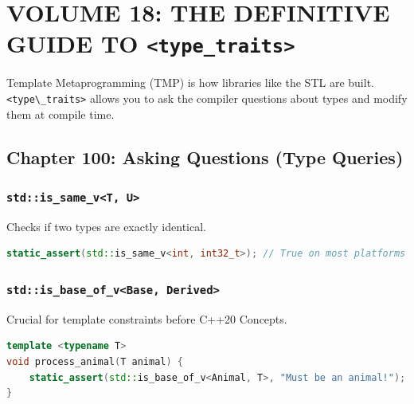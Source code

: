 \hypertarget{volume-18-the-definitive-guide-to-type_traits}{%
\section{\texorpdfstring{VOLUME 18: THE DEFINITIVE GUIDE TO
\texttt{\textless{}type\_traits\textgreater{}}}{VOLUME 18: THE DEFINITIVE GUIDE TO \textless type\_traits\textgreater{}}}\label{volume-18-the-definitive-guide-to-type_traits}}

Template Metaprogramming (TMP) is how libraries like the STL are built.
\passthrough{\lstinline!<type\_traits>!} allows you to ask the compiler
questions about types and modify them at compile time.

\hypertarget{chapter-100-asking-questions-type-queries}{%
\subsection{Chapter 100: Asking Questions (Type
Queries)}\label{chapter-100-asking-questions-type-queries}}

\hypertarget{stdis_same_vt-u}{%
\subsubsection{\texorpdfstring{\texttt{std::is\_same\_v\textless{}T,\ U\textgreater{}}}{std::is\_same\_v\textless T, U\textgreater{}}}\label{stdis_same_vt-u}}

Checks if two types are exactly identical.

\begin{lstlisting}[language={C++}]
static_assert(std::is_same_v<int, int32_t>); // True on most platforms
\end{lstlisting}

\hypertarget{stdis_base_of_vbase-derived}{%
\subsubsection{\texorpdfstring{\texttt{std::is\_base\_of\_v\textless{}Base,\ Derived\textgreater{}}}{std::is\_base\_of\_v\textless Base, Derived\textgreater{}}}\label{stdis_base_of_vbase-derived}}

Crucial for template constraints before C++20 Concepts.

\begin{lstlisting}[language={C++}]
template <typename T>
void process_animal(T animal) {
    static_assert(std::is_base_of_v<Animal, T>, "Must be an animal!");
}
\end{lstlisting}

